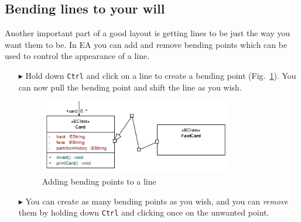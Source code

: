 \newpage

\subsection{Bending lines to your will}

Another important part of a good layout is getting lines to be just the way you want them to be. In EA you can add and remove bending points which can be used
to control the appearance of a line.

\begin{enumerate}
\item[$\blacktriangleright$]Hold down \texttt{Ctrl} and click on a line to create a bending point (Fig.~\ref{ea:bendLines}). You can now pull the bending point
and shift the line as you wish.
 
\begin{figure}[htbp]
\begin{center}
  \includegraphics[width=0.8\textwidth]{ea_bendingLines}
  \caption{Adding bending points to a line}   
  \label{ea:bendLines}
\end{center}
\end{figure}

\item[$\blacktriangleright$] You can create as many bending points as you wish, and you can \emph{remove} them by holding down \texttt{Ctrl} and clicking once
on the unwanted point.
\end{enumerate}
